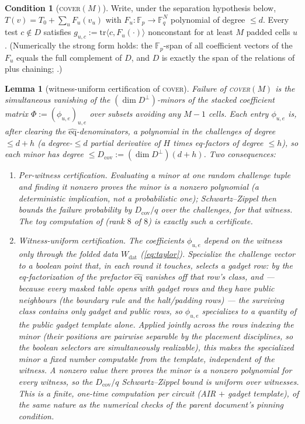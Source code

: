 \documentclass{article}
\newcommand{\Fp}{\mathbb{F}_p}
\newcommand{\Fq}{\mathbb{F}_q}
\newcommand{\eqf}{\widehat{\mathrm{eq}}}
\newcommand{\dat}{\mathrm{dat}}
\newtheorem{lemma}[theorem]{Lemma}
\theoremstyle{definition}
\newtheorem{condition}[theorem]{Condition}
\begin{document}
\begin{condition}[\textsc{cover}$(M)$]\label{cond:cover}
Write, under the separation hypothesis below, $T(v) = T_0 + \sum_{u} F_u(v_u)$ with $F_u : \Fp \to \Fq^N$ polynomial of degree $\leq d$. Every test $c \notin D$ satisfies $g_{u,c} := \mathrm{tr}\langle c, F_u(\cdot)\rangle$ nonconstant for at least $M$ padded cells $u$. (Numerically the strong form holds: the $\Fp$-span of all coefficient vectors of the $F_u$ equals the full complement of $D$, and $D$ is exactly the span of the relations of  plus chaining; .)
\end{condition}

\begin{lemma}[witness-uniform certification of \textsc{cover}]\label{lem:certify}
Failure of \textsc{cover}$(M)$ is the simultaneous vanishing of the $(\dim D^{\perp})$-minors of the stacked coefficient matrix $\Phi := (\phi_{u,e})_{u,e}$ over subsets avoiding any $M - 1$ cells. Each entry $\phi_{u,e}$ is, after clearing the $\eqf$-denominators, a polynomial in the challenges of degree $\leq d + h$ (a degree-$\leq d$ partial derivative of $H$ times eq-factors of degree $\leq h$), so each minor has degree $\leq D_{\mathrm{cov}} := (\dim D^{\perp})(d + h)$. Two consequences:
\begin{enumerate}
    \item \emph{Per-witness certification.} Evaluating a minor at one random challenge tuple and finding it nonzero \emph{proves} the minor is a nonzero polynomial (a deterministic implication, not a probabilistic one); Schwartz--Zippel then bounds the failure probability by $D_{\mathrm{cov}}/q$ over the challenges, for that witness. The toy computation of  (rank $8$ of $8$) is exactly such a certificate.
    \item \emph{Witness-uniform certification.} The coefficients $\phi_{u,e}$ depend on the witness only through the folded data $W_{\dat}$ (\cref{eq:taylor}). Specialize the challenge vector to a boolean point that, in each round it touches, selects a gadget row: by the eq-factorization of  the prefactor $\eqf$ vanishes off that row's class, and --- because every masked table opens with gadget rows and they have public neighbours (the boundary rule and the halt/padding rows) --- the surviving class contains only gadget and public rows, so $\phi_{u,e}$ specializes to a quantity of the \emph{public gadget template} alone. Applied jointly across the rows indexing the minor (their positions are pairwise separable by the placement disciplines, so the boolean selectors are simultaneously realizable), this makes the specialized minor a fixed number computable from the template, independent of the witness. A nonzero value there proves the minor is a nonzero polynomial \emph{for every} witness, so the $D_{\mathrm{cov}}/q$ Schwartz--Zippel bound is uniform over witnesses. This is a finite, one-time computation per circuit (AIR $+$ gadget template), of the same nature as the numerical checks of the parent document's pinning condition.
\end{enumerate}
\end{lemma}
\end{document}
